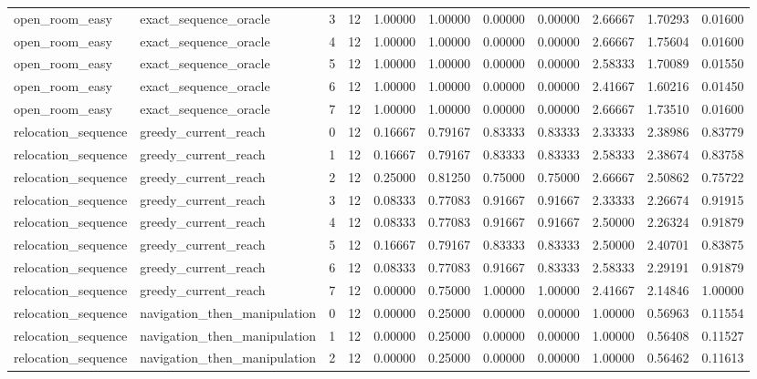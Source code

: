 \documentclass{article}
\begin{document}
\begin{table}[tbp]
{\begin{tabular}{lllllllllll}
open\_room\_easy & exact\_sequence\_oracle & 3 & 12 & 1.00000 & 1.00000 & 0.00000 & 0.00000 & 2.66667 & 1.70293 & 0.01600 \\
open\_room\_easy & exact\_sequence\_oracle & 4 & 12 & 1.00000 & 1.00000 & 0.00000 & 0.00000 & 2.66667 & 1.75604 & 0.01600 \\
open\_room\_easy & exact\_sequence\_oracle & 5 & 12 & 1.00000 & 1.00000 & 0.00000 & 0.00000 & 2.58333 & 1.70089 & 0.01550 \\
open\_room\_easy & exact\_sequence\_oracle & 6 & 12 & 1.00000 & 1.00000 & 0.00000 & 0.00000 & 2.41667 & 1.60216 & 0.01450 \\
open\_room\_easy & exact\_sequence\_oracle & 7 & 12 & 1.00000 & 1.00000 & 0.00000 & 0.00000 & 2.66667 & 1.73510 & 0.01600 \\
relocation\_sequence & greedy\_current\_reach & 0 & 12 & 0.16667 & 0.79167 & 0.83333 & 0.83333 & 2.33333 & 2.38986 & 0.83779 \\
relocation\_sequence & greedy\_current\_reach & 1 & 12 & 0.16667 & 0.79167 & 0.83333 & 0.83333 & 2.58333 & 2.38674 & 0.83758 \\
relocation\_sequence & greedy\_current\_reach & 2 & 12 & 0.25000 & 0.81250 & 0.75000 & 0.75000 & 2.66667 & 2.50862 & 0.75722 \\
relocation\_sequence & greedy\_current\_reach & 3 & 12 & 0.08333 & 0.77083 & 0.91667 & 0.91667 & 2.33333 & 2.26674 & 0.91915 \\
relocation\_sequence & greedy\_current\_reach & 4 & 12 & 0.08333 & 0.77083 & 0.91667 & 0.91667 & 2.50000 & 2.26324 & 0.91879 \\
relocation\_sequence & greedy\_current\_reach & 5 & 12 & 0.16667 & 0.79167 & 0.83333 & 0.83333 & 2.50000 & 2.40701 & 0.83875 \\
relocation\_sequence & greedy\_current\_reach & 6 & 12 & 0.08333 & 0.77083 & 0.91667 & 0.83333 & 2.58333 & 2.29191 & 0.91879 \\
relocation\_sequence & greedy\_current\_reach & 7 & 12 & 0.00000 & 0.75000 & 1.00000 & 1.00000 & 2.41667 & 2.14846 & 1.00000 \\
relocation\_sequence & navigation\_then\_manipulation & 0 & 12 & 0.00000 & 0.25000 & 0.00000 & 0.00000 & 1.00000 & 0.56963 & 0.11554 \\
relocation\_sequence & navigation\_then\_manipulation & 1 & 12 & 0.00000 & 0.25000 & 0.00000 & 0.00000 & 1.00000 & 0.56408 & 0.11527 \\
relocation\_sequence & navigation\_then\_manipulation & 2 & 12 & 0.00000 & 0.25000 & 0.00000 & 0.00000 & 1.00000 & 0.56462 & 0.11613 \\

\end{tabular}}
\end{table}
\end{document}
